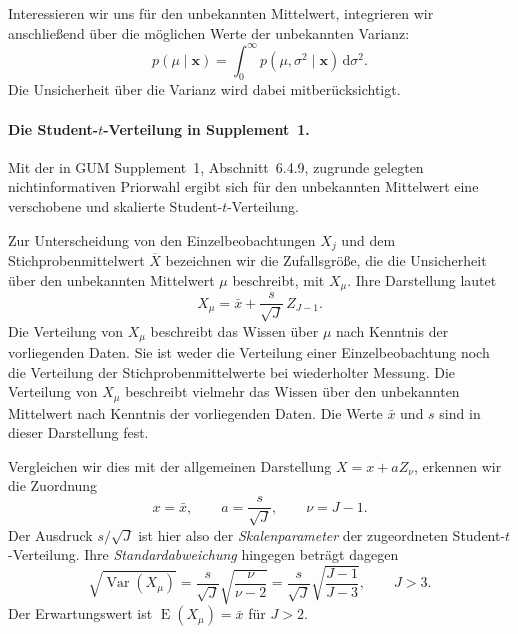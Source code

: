 Interessieren wir uns für den unbekannten Mittelwert,
integrieren wir anschließend über die möglichen Werte
der unbekannten Varianz:
\begin{equation}
p(\mu\mid\mathbf x)
=
\int_0^\infty
p(\mu,\sigma^2\mid\mathbf x)\,\mathrm d\sigma^2.
\end{equation}
Die Unsicherheit über die Varianz wird dabei mitberücksichtigt.

\paragraph{Die Student-$t$-Verteilung in Supplement~1.}

Mit der in GUM Supplement~1, Abschnitt~6.4.9, zugrunde gelegten
nichtinformativen Priorwahl ergibt sich für den unbekannten
Mittelwert eine verschobene und skalierte Student-$t$-Verteilung.

Zur Unterscheidung von den Einzelbeobachtungen $X_j$ und dem
Stichprobenmittelwert $\overline X$ bezeichnen wir die Zufallsgröße,
die die Unsicherheit über den unbekannten Mittelwert $\mu$
beschreibt, mit $X_\mu$. Ihre Darstellung lautet
\begin{equation}
X_\mu=\bar x+\frac{s}{\sqrt J}\,Z_{J-1}.
\end{equation}
Die Verteilung von $X_\mu$ beschreibt das Wissen über $\mu$
nach Kenntnis der vorliegenden Daten. Sie ist weder die
Verteilung einer Einzelbeobachtung noch die Verteilung
der Stichprobenmittelwerte bei wiederholter Messung.
Die Verteilung von $X_\mu$ beschreibt vielmehr das Wissen über
den unbekannten Mittelwert nach Kenntnis der vorliegenden Daten.
Die Werte $\bar x$ und $s$ sind in dieser Darstellung fest.

Vergleichen wir dies mit der allgemeinen Darstellung
$X=x+aZ_\nu$, erkennen wir die Zuordnung
\begin{equation}
x=\bar x,
\qquad
a=\frac{s}{\sqrt J},
\qquad
\nu=J-1.
\end{equation}
Der Ausdruck $s/\sqrt J$ ist hier also der
\emph{Skalenparameter} der zugeordneten Student-$t$-Verteilung.
Ihre \emph{Standardabweichung} hingegen beträgt dagegen
\begin{equation}
\sqrt{\operatorname{Var}(X_\mu)}
=
\frac{s}{\sqrt J}\sqrt{\frac{\nu}{\nu-2}}
=
\frac{s}{\sqrt J}\sqrt{\frac{J-1}{J-3}},
\qquad J>3.
\end{equation}
Der Erwartungswert ist $\operatorname E(X_\mu)=\bar x$ für $J>2$.

\begin{center}
\end{center}


